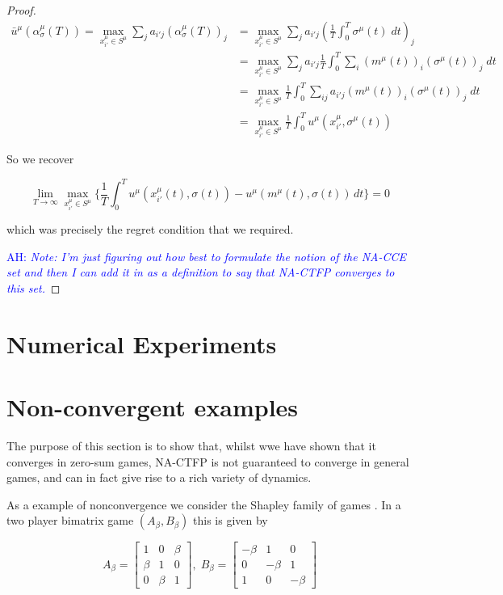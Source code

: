 \documentclass{article}
\theoremstyle{definition}
\newcommand{\ah}[1]{\textcolor{blue}{AH: \textit{#1}}}
\begin{document}
\begin{proof}
		\begin{align}
			\bar{u}^\mu (\alpha_\sigma^\mu (T)) = \max_{x^\mu_{i'} \in S^\mu} \sum_{j} a_{i'j} (\alpha_{\sigma}^\mu (T))_j & = \max_{x^\mu_{i'} \in S^\mu} \sum_{j} a_{i'j} (\frac{1}{T} \int_{0}^{T} \sigma^\mu(t) \; dt)_j \\
			& = \max_{x^\mu_{i'} \in S^\mu} \sum_{j} a_{i'j} \frac{1}{T} \int_{0}^{T} \sum_i (m^\mu (t))_i (\sigma^\mu(t))_j \; dt\\
			& = \max_{x^\mu_{i'} \in S^\mu} \frac{1}{T} \int_0^T \sum_{ij} a_{i'j} (m^\mu (t))_i (\sigma^\mu(t))_j \; dt\\
			& = \max_{x^\mu_{i'} \in S^\mu} \frac{1}{T} \int_0^T u^\mu(x^\mu_{i'}, \sigma^\mu(t))
		\end{align}

		So we recover

		\begin{equation}
			\lim_{T \rightarrow \infty} \max_{x_{i'}^\mu \in S^\mu} \Big\{ \frac{1}{T} \int_{0}^{T} u^{\mu}(x_{i'}^\mu(t), \sigma(t)) - u^{\mu}(m^\mu(t), \sigma(t)) \, dt \Big\} = 0
		\end{equation}

		which was precisely the regret condition that we required.

		\ah{Note: I'm just figuring out how best to formulate the notion of the NA-CCE set and then I can add it in as a definition to say that NA-CTFP converges to this set.}
	\end{proof}


	\section{Numerical Experiments}

	\section{Non-convergent examples}
	The purpose of this section is to show that, whilst wwe have shown that it converges in zero-sum games, NA-CTFP is not guaranteed to converge in general games, and can in fact give rise to a rich variety of dynamics.

	
	
	As a example of nonconvergence we consider the Shapley family of games \cite{}. In a two player bimatrix game $(A_\beta, B_\beta)$ this is given by

	\begin{equation}
		A_\beta = \begin{bmatrix}
			1 & 0 & \beta \\
			\beta & 1 & 0 \\
			0 & \beta & 1
		\end{bmatrix}, \; B_\beta =  \begin{bmatrix}
			- \beta & 1 & 0 \\
			0 & -\beta & 1 \\
			1 & 0 & -\beta
		\end{bmatrix}
	\end{equation}
\end{document}
